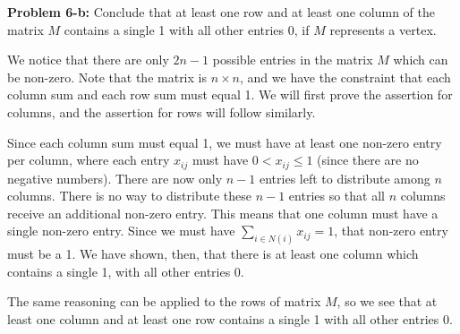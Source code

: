 \documentclass[psamsfonts]{amsart}
\newenvironment{sol}{\vspace{0.25cm}{\large \bfseries Solution:}}{\qedsymbol}
\newenvironment{prob}[1]{\begin{framed}{\large \bfseries Problem #1:}}{\end{framed}}
\begin{document}
\begin{prob}{6-b}
Conclude that at least one row and at least one column of the matrix $M$ contains a single 1 with all other entries 0, if $M$ represents a vertex.
\end{prob}
\begin{sol}
We notice that there are only $2n-1$ possible entries in the matrix $M$ which can be non-zero. Note that the matrix is $n\times n$, and we have the constraint that each column sum and each row sum must equal 1. We will first prove the assertion for columns, and the assertion for rows will follow similarly.

Since each column sum must equal 1, we must have at least one non-zero entry per column, where each entry $x_{ij}$ must have $0 < x_{ij} \leq 1$ (since there are no negative numbers). There are now only $n-1$ entries left to distribute among $n$ columns. There is no way to distribute these $n-1$ entries so that all $n$ columns receive an additional non-zero entry. This means that one column must have a single non-zero entry. Since we must have $\sum_{i \in N(i)} x_{ij} = 1$, that non-zero entry must be a 1. We have shown, then, that there is at least one column which contains a single 1, with all other entries 0. 

The same reasoning can be applied to the rows of matrix $M$, so we see that at least one column and at least one row contains a single 1 with all other entries 0.
\end{sol}
\end{document}
